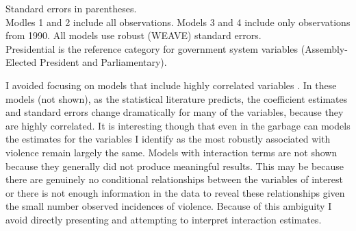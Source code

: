 \documentclass[a4paper]{article}\usepackage{graphicx, color}
\begin{document}
\begin{table}
\begin{center}
\end{center}
{\scriptsize{
    Standard errors in parentheses. \\
    Modles 1 and 2 include all observations. Models 3 and 4 include only observations from 1990.
    All models use robust (WEAVE) standard errors. \\
    Presidential is the reference category for government system variables (Assembly-Elected President and Parliamentary). \\
}}
\end{table}

I avoided focusing on models that include highly correlated variables \citep[see][]{Achen2002, Schrodt2006}. In these models (not shown), as the statistical literature predicts, the coefficient estimates and standard errors change dramatically for many of the variables, because they are highly correlated. It is interesting though that even in the garbage can models the estimates for the variables I identify as the most robustly associated with violence remain largely the same. Models with interaction terms are not shown because they generally did not produce meaningful results. This may be because there are genuinely no conditional relationships between the variables of interest or there is not enough information in the data to reveal these relationships given the small number observed incidences of violence. Because of this ambiguity I avoid directly presenting and attempting to interpret interaction estimates. 
\end{document}
